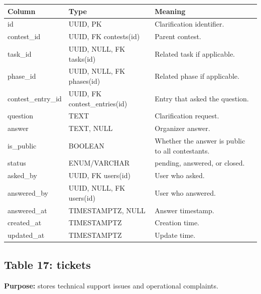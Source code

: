 \documentclass[11pt,a4paper]{article}
\begin{document}
\begin{longtable}{>{\raggedright\arraybackslash}p{} >{\raggedright\arraybackslash}p{} >{\raggedright\arraybackslash}p{}}
\toprule
\textbf{Column} & \textbf{Type} & \textbf{Meaning} \\
\midrule
id & UUID, PK & Clarification identifier. \\
contest\_id & UUID, FK contests(id) & Parent contest. \\
task\_id & UUID, NULL, FK tasks(id) & Related task if applicable. \\
phase\_id & UUID, NULL, FK phases(id) & Related phase if applicable. \\
contest\_entry\_id & UUID, FK contest\_entries(id) & Entry that asked the question. \\
question & TEXT & Clarification request. \\
answer & TEXT, NULL & Organizer answer. \\
is\_public & BOOLEAN & Whether the answer is public to all contestants. \\
status & ENUM/VARCHAR & pending, answered, or closed. \\
asked\_by & UUID, FK users(id) & User who asked. \\
answered\_by & UUID, NULL, FK users(id) & User who answered. \\
answered\_at & TIMESTAMPTZ, NULL & Answer timestamp. \\
created\_at & TIMESTAMPTZ & Creation time. \\
updated\_at & TIMESTAMPTZ & Update time. \\
\bottomrule
\end{longtable}

\subsection{Table 17: tickets}
\textbf{Purpose:} stores technical support issues and operational complaints.
\end{document}
